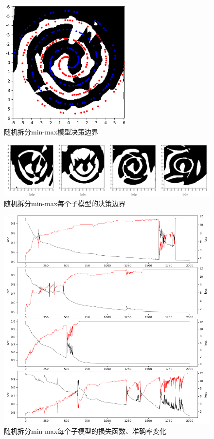 \documentclass[12pt, a4paper, oneside]{ctexart}
\begin{document}
    \begin{figure}[htbp]
        \centering
        \includegraphics[width=0.6\textwidth]{figures/minmax_random_boundary.png}
        \caption{随机拆分min-max模型决策边界}
        \label{Fig-minmax-random-boundary}
    \end{figure}

    \begin{figure}[htbp]
        \centering
        \includegraphics[width=1.0\textwidth]{figures/minmax_random_each_boundary.png}
        \caption{随机拆分min-max每个子模型的决策边界}
        \label{Fig-minmax-random-each-boundary}
    \end{figure}

    \begin{figure}[htbp]
        \centering
        \includegraphics[width=1\textwidth]{figures/minmax_random_logging.png}
        \caption{随机拆分min-max每个子模型的损失函数、准确率变化}
        \label{Fig-minmax-random-logging}
    \end{figure}
\end{document}

